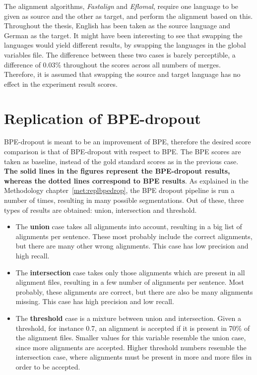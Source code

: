 The alignment algorithms, \emph{Fastalign} and \emph{Eflomal}, require one language to be given as source and the other as target, and perform the alignment based on this. Throughout the thesis, English has been taken as the source language and German as the target. It might have been interesting to see that swapping the languages would yield different results, by swapping the languages in the global variables file. The difference between these two cases is barely perceptible, a difference of 0.03\% throughout the scores across all numbers of merges. Therefore, it is assumed that swapping the source and target language has no effect in the experiment result scores.

\section{Replication of BPE-dropout}

BPE-dropout is meant to be an improvement of BPE, therefore the desired score comparison is that of BPE-dropout with respect to BPE. The BPE scores are taken as baseline, instead of the gold standard scores as in the previous case. \textbf{The solid lines in the figures represent the BPE-dropout results, whereas the dotted lines correspond to BPE results}. As explained in the Methodology chapter~\ref{met:replbpedrop}, the BPE dropout pipeline is run a number of times, resulting in many possible segmentations. Out of these, three types of results are obtained: union, intersection and threshold.

\begin{itemize}
	\item The \textbf{union} case takes all alignments into account, resulting in a big list of alignments per sentence. These most probably include the correct alignments, but there are many other wrong alignments. This case has low precision and high recall.
	\item The \textbf{intersection} case takes only those alignments which are present in all alignment files, resulting in a few number of alignments per sentence. Most probably, these alignments are correct, but there are also be many alignments missing. This case has high precision and low recall.
	\item The \textbf{threshold} case is a mixture between union and intersection. Given a threshold, for instance 0.7, an alignment is accepted if it is present in 70\% of the alignment files. Smaller values for this variable resemble the union case, since more alignments are accepted. Higher threshold numbers resemble the intersection case, where alignments must be present in more and more files in order to be accepted.
\end{itemize}

